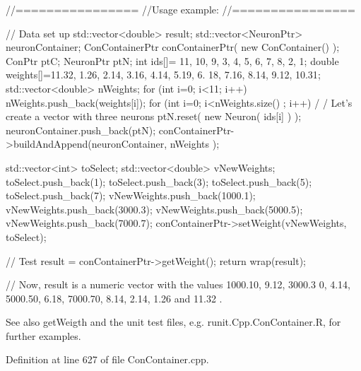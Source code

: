 \begin{DoxyCode}
        //================
        //Usage example:
        //================

        // Data set up
                std::vector<double> result;
                        std::vector<NeuronPtr> neuronContainer;
                        ConContainerPtr conContainerPtr( new ConContainer() );
                        ConPtr  ptC;
                        NeuronPtr ptN;
                        int ids[]= {11, 10, 9, 3, 4, 5, 6, 7, 8, 2, 1};
                        double weights[]={11.32, 1.26, 2.14, 3.16, 4.14, 5.19, 6.
      18, 7.16, 8.14, 9.12, 10.31};
                        std::vector<double> nWeights;
                        for (int i=0; i<11; i++) {
                        nWeights.push_back(weights[i]);
                        }
                        for (int i=0; i<nWeights.size() ; i++) {                                /
      / Let's create a vector with three neurons
                        ptN.reset( new Neuron( ids[i] ) );
                        neuronContainer.push_back(ptN);
                        }
                        conContainerPtr->buildAndAppend(neuronContainer, nWeights
      );

                        std::vector<int> toSelect;
                        std::vector<double> vNewWeights;
                        toSelect.push_back(1);
                        toSelect.push_back(3);
                        toSelect.push_back(5);
                        toSelect.push_back(7);
                        vNewWeights.push_back(1000.1);
                        vNewWeights.push_back(3000.3);
                        vNewWeights.push_back(5000.5);
                        vNewWeights.push_back(7000.7);
                        conContainerPtr->setWeight(vNewWeights, toSelect);

        // Test
                        result = conContainerPtr->getWeight();
                        return wrap(result);

        // Now, result is a numeric vector with the values  1000.10, 9.12, 3000.3
      0, 4.14, 5000.50, 6.18, 7000.70, 8.14, 2.14, 1.26 and 11.32 .
\end{DoxyCode}


\begin{DoxySeeAlso}{See also}
getWeigth and the unit test files, e.g. runit.Cpp.ConContainer.R, for further examples. 
\end{DoxySeeAlso}


Definition at line 627 of file ConContainer.cpp.



